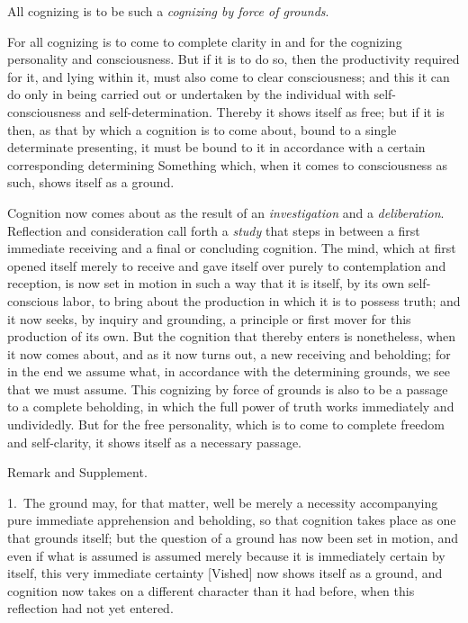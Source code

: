 \documentclass[12pt,a4paper]{book}
\begin{document}
All cognizing is to be such a \emph{cognizing by force of grounds}.

For all cognizing is to come to complete clarity in and for the cognizing
personality and consciousness. But if it is to do so, then the productivity
required for it, and lying within it, must also come to clear consciousness; and
this it can do only in being carried out or undertaken by the individual with
self-consciousness and self-determination. Thereby it shows itself as free; but
if it is then, as that by which a cognition is to come about, bound to a single
determinate presenting, it must be bound to it in accordance with a certain
corresponding determining Something which, when it comes to consciousness as
such, shows itself as a ground.

Cognition now comes about as the result of an \emph{investigation} and a \emph{deliberation}.
Reflection and consideration call forth a \emph{study} that steps in between a
first immediate receiving and a final or concluding cognition. The mind, which
at first opened itself merely to receive and gave itself over purely to
contemplation and reception, is now set in motion in such a way that it is
itself, by its own self-conscious labor, to bring about the production in which
it is to possess truth; and it now seeks, by inquiry and grounding, a principle
or first mover for this production of its own. But the cognition that thereby
enters is nonetheless, when it now comes about, and as it now turns out, a new
receiving and beholding; for in the end we assume what, in accordance with the
determining grounds, we see that we must assume. This cognizing by force of
grounds is also to be a passage to a complete beholding, in which the full power
of truth works immediately and undividedly. But for the free personality, which
is to come to complete freedom and self-clarity, it shows itself as a necessary
passage.

\begin{center}Remark and Supplement.\end{center}
1.~The ground may, for that matter, well be merely a necessity accompanying pure
immediate apprehension and beholding, so that cognition takes place as one that
grounds itself; but the question of a ground has now been set in motion, and even
if what is assumed is assumed merely because it is immediately certain by itself,
this very immediate certainty [Vished] now shows itself as a ground, and
cognition now takes on a different character than it had before, when this
reflection had not yet entered.
\end{document}
